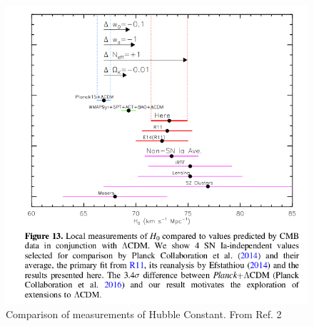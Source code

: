 \documentclass{article}
\begin{document}
\begin{figure}[h]
\begin{minipage}[b]{.6\textwidth}
\begin{center}
\includegraphics[width=\textwidth,angle=0.]{hubble1.png}
\end{center}
\caption{Comparison of measurements of Hubble Constant. From Ref. 2}
\end{minipage}
\hfill
\begin{minipage}[b]{.4\textwidth}
\begin{center}

\end{center}
\end{minipage}
\end{figure}
\end{document}

